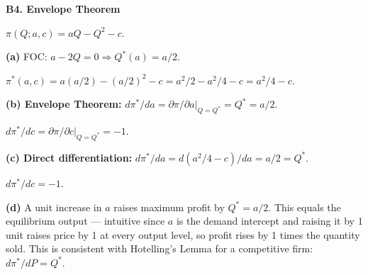 \documentclass[12pt, a4paper]{article}
\theoremstyle{definition}
\begin{document}
\begin{solbox}
\textbf{B4. Envelope Theorem}

$\pi(Q;a,c) = aQ-Q^2-c$.

\textbf{(a)} FOC: $a-2Q=0 \Rightarrow Q^*(a)=a/2$.

$\pi^*(a,c) = a(a/2)-(a/2)^2-c = a^2/2-a^2/4-c = a^2/4-c$.

\textbf{(b) Envelope Theorem:}
$d\pi^*/da = \partial\pi/\partial a|_{Q=Q^*} = Q^* = a/2$.

$d\pi^*/dc = \partial\pi/\partial c|_{Q=Q^*} = -1$.

\textbf{(c) Direct differentiation:}
$d\pi^*/da = d(a^2/4-c)/da = a/2 = Q^*$. \checkmark

$d\pi^*/dc = -1$. \checkmark

\textbf{(d)} A unit increase in $a$ raises maximum profit by $Q^* = a/2$. This equals the equilibrium output --- intuitive since $a$ is the demand intercept and raising it by 1 unit raises price by 1 at every output level, so profit rises by 1 times the quantity sold. This is consistent with Hotelling's Lemma for a competitive firm: $d\pi^*/dP = Q^*$.
\end{solbox}
\end{document}
